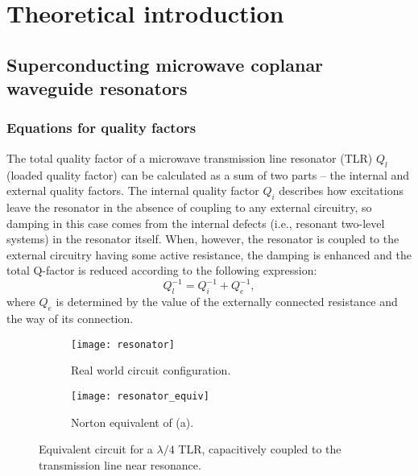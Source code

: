 \chapter{Theoretical introduction}

\section{Superconducting microwave coplanar waveguide resonators}

\subsection{Equations for quality factors}

The total quality factor of a microwave transmission line resonator (TLR) $Q_l$ (loaded quality factor) can be calculated as a sum of two parts -- the internal and external quality factors. The internal quality factor $Q_i$ describes how excitations leave the resonator in the absence of coupling to any external circuitry, so damping in this case comes from the internal defects (i.e., resonant two-level systems) in the resonator itself. When, however, the resonator is coupled to the external circuitry having some active resistance, the damping is enhanced and the total Q-factor is reduced according to the following expression:
\begin{equation}
Q_l^{-1} = Q_i^{-1}+Q_e^{-1},
\label{eq:qfactor}
\end{equation}
where $Q_e$ is determined by the value of the externally connected resistance and the way of its connection.

\begin{figure}
\captionsetup[subfigure]{width = 0.9\textwidth, justification=normal}
\centering
\begin{subfigure}[t]{0.48\textwidth}
\centering
\texttt{[image: resonator]}
\caption{Real world circuit configuration.}
\end{subfigure}
\begin{subfigure}[t]{0.48\textwidth}
\centering
\texttt{[image: resonator\_equiv]}
\caption{Norton equivalent of (a).}
\end{subfigure}

\caption{Equivalent circuit for a $\lambda/4$ TLR, capacitively coupled to the transmission line near resonance.}
\label{fig:resonator_equiv}
\end{figure}

